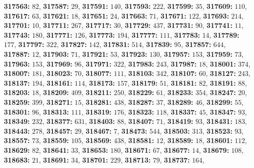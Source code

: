 \textsf{\bfseries 317563:} $82$, \textsf{\bfseries 317587:} $29$, \textsf{\bfseries 317591:} $140$, \textsf{\bfseries 317593:} $222$, \textsf{\bfseries 317599:} $35$, \textsf{\bfseries 317609:} $110$, \textsf{\bfseries 317617:} $63$, \textsf{\bfseries 317621:} $18$, \textsf{\bfseries 317651:} $24$, \textsf{\bfseries 317663:} $71$, \textsf{\bfseries 317671:} $122$, \textsf{\bfseries 317693:} $214$, \textsf{\bfseries 317701:} $10$, \textsf{\bfseries 317711:} $267$, \textsf{\bfseries 317717:} $30$, \textsf{\bfseries 317729:} $437$, \textsf{\bfseries 317731:} $90$, \textsf{\bfseries 317741:} $11$, \textsf{\bfseries 317743:} $180$, \textsf{\bfseries 317771:} $126$, \textsf{\bfseries 317773:} $194$, \textsf{\bfseries 317777:} $111$, \textsf{\bfseries 317783:} $14$, \textsf{\bfseries 317789:} $177$, \textsf{\bfseries 317797:} $322$, \textsf{\bfseries 317827:} $142$, \textsf{\bfseries 317831:} $514$, \textsf{\bfseries 317839:} $95$, \textsf{\bfseries 317857:} $644$, \textsf{\bfseries 317887:} $12$, \textsf{\bfseries 317903:} $71$, \textsf{\bfseries 317921:} $53$, \textsf{\bfseries 317923:} $130$, \textsf{\bfseries 317957:} $153$, \textsf{\bfseries 317959:} $73$, \textsf{\bfseries 317963:} $153$, \textsf{\bfseries 317969:} $96$, \textsf{\bfseries 317971:} $322$, \textsf{\bfseries 317983:} $243$, \textsf{\bfseries 317987:} $18$, \textsf{\bfseries 318001:} $374$, \textsf{\bfseries 318007:} $181$, \textsf{\bfseries 318023:} $70$, \textsf{\bfseries 318077:} $111$, \textsf{\bfseries 318103:} $342$, \textsf{\bfseries 318107:} $60$, \textsf{\bfseries 318127:} $243$, \textsf{\bfseries 318137:} $194$, \textsf{\bfseries 318161:} $114$, \textsf{\bfseries 318173:} $157$, \textsf{\bfseries 318179:} $51$, \textsf{\bfseries 318181:} $82$, \textsf{\bfseries 318191:} $88$, \textsf{\bfseries 318203:} $18$, \textsf{\bfseries 318209:} $409$, \textsf{\bfseries 318211:} $250$, \textsf{\bfseries 318229:} $61$, \textsf{\bfseries 318233:} $354$, \textsf{\bfseries 318247:} $20$, \textsf{\bfseries 318259:} $399$, \textsf{\bfseries 318271:} $15$, \textsf{\bfseries 318281:} $438$, \textsf{\bfseries 318287:} $37$, \textsf{\bfseries 318289:} $46$, \textsf{\bfseries 318299:} $55$, \textsf{\bfseries 318301:} $96$, \textsf{\bfseries 318313:} $111$, \textsf{\bfseries 318319:} $176$, \textsf{\bfseries 318323:} $118$, \textsf{\bfseries 318337:} $45$, \textsf{\bfseries 318347:} $93$, \textsf{\bfseries 318349:} $232$, \textsf{\bfseries 318377:} $631$, \textsf{\bfseries 318403:} $88$, \textsf{\bfseries 318407:} $71$, \textsf{\bfseries 318419:} $93$, \textsf{\bfseries 318431:} $183$, \textsf{\bfseries 318443:} $278$, \textsf{\bfseries 318457:} $29$, \textsf{\bfseries 318467:} $7$, \textsf{\bfseries 318473:} $544$, \textsf{\bfseries 318503:} $313$, \textsf{\bfseries 318523:} $93$, \textsf{\bfseries 318557:} $73$, \textsf{\bfseries 318559:} $105$, \textsf{\bfseries 318569:} $438$, \textsf{\bfseries 318581:} $12$, \textsf{\bfseries 318589:} $18$, \textsf{\bfseries 318601:} $112$, \textsf{\bfseries 318629:} $82$, \textsf{\bfseries 318641:} $33$, \textsf{\bfseries 318653:} $180$, \textsf{\bfseries 318671:} $67$, \textsf{\bfseries 318677:} $14$, \textsf{\bfseries 318679:} $108$, \textsf{\bfseries 318683:} $21$, \textsf{\bfseries 318691:} $34$, \textsf{\bfseries 318701:} $229$, \textsf{\bfseries 318713:} $79$, \textsf{\bfseries 318737:} $164$, 
